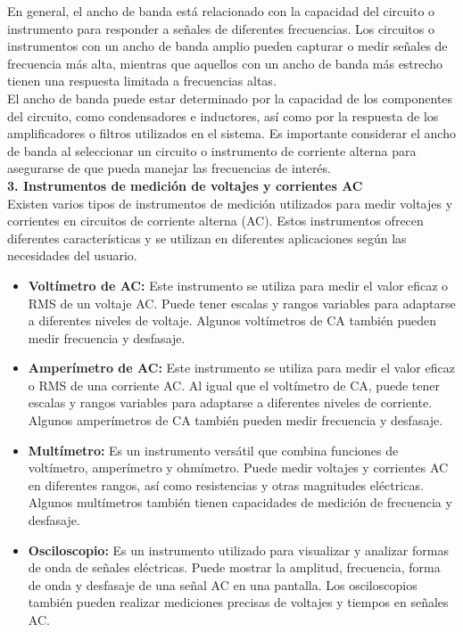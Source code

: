 \documentclass[12pt]{article}
\begin{document}
	En general, el ancho de banda está relacionado con la capacidad del circuito o instrumento para responder a señales de diferentes frecuencias. Los circuitos o instrumentos con un ancho de banda amplio pueden capturar o medir señales de frecuencia más alta, mientras que aquellos con un ancho de banda más estrecho tienen una respuesta limitada a frecuencias altas.\\
	
	El ancho de banda puede estar determinado por la capacidad de los componentes del circuito, como condensadores e inductores, así como por la respuesta de los amplificadores o filtros utilizados en el sistema. Es importante considerar el ancho de banda al seleccionar un circuito o instrumento de corriente alterna para asegurarse de que pueda manejar las frecuencias de interés.\\
	
	\textbf{3. Instrumentos de medición de voltajes y corrientes AC}\\
	
	Existen varios tipos de instrumentos de medición utilizados para medir voltajes y corrientes en circuitos de corriente alterna (AC). Estos instrumentos ofrecen diferentes características y se utilizan en diferentes aplicaciones según las necesidades del usuario.
	
	\begin{itemize}
		\item \textbf{Voltímetro de AC:} Este instrumento se utiliza para medir el valor eficaz o RMS de un voltaje AC. Puede tener escalas y rangos variables para adaptarse a diferentes niveles de voltaje. Algunos voltímetros de CA también pueden medir frecuencia y desfasaje.
		
		\item \textbf{Amperímetro de AC:} Este instrumento se utiliza para medir el valor eficaz o RMS de una corriente AC. Al igual que el voltímetro de CA, puede tener escalas y rangos variables para adaptarse a diferentes niveles de corriente. Algunos amperímetros de CA también pueden medir frecuencia y desfasaje.
		
		\item \textbf{Multímetro:} Es un instrumento versátil que combina funciones de voltímetro, amperímetro y ohmímetro. Puede medir voltajes y corrientes AC en diferentes rangos, así como resistencias y otras magnitudes eléctricas. Algunos multímetros también tienen capacidades de medición de frecuencia y desfasaje.
		
		\item \textbf{Osciloscopio:} Es un instrumento utilizado para visualizar y analizar formas de onda de señales eléctricas. Puede mostrar la amplitud, frecuencia, forma de onda y desfasaje de una señal AC en una pantalla. Los osciloscopios también pueden realizar mediciones precisas de voltajes y tiempos en señales AC.
		
	\end{itemize}
	
\end{document}
